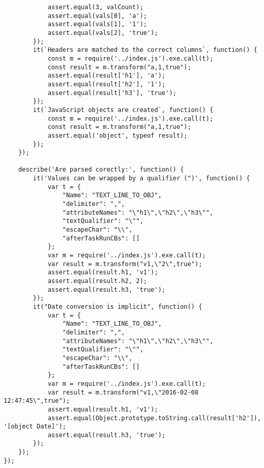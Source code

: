 \begin{verbatim}
            assert.equal(3, valCount);
            assert.equal(vals[0], 'a');
            assert.equal(vals[1], '1');
            assert.equal(vals[2], 'true');
        });
        it(`Headers are matched to the correct columns`, function() {
            const m = require('../index.js').exe.call(t);
            const result = m.transform("a,1,true");
            assert.equal(result['h1'], 'a');
            assert.equal(result['h2'], '1');
            assert.equal(result['h3'], 'true');
        });
        it(`JavaScript objects are created`, function() {
            const m = require('../index.js').exe.call(t);
            const result = m.transform("a,1,true");
            assert.equal('object', typeof result);
        });
    });

    describe('Are parsed corectly:', function() {
        it('Values can be wrapped by a qualifier (")', function() {
            var t = {
                "Name": "TEXT_LINE_TO_OBJ",
                "delimiter": ",",
                "attributeNames": "\"h1\",\"h2\",\"h3\"",
                "textQualifier": "\"",
                "escapeChar": "\\",
                "afterTaskRunCBs": []
            };
            var m = require('../index.js').exe.call(t);
            var result = m.transform("v1,\"2\",true");
            assert.equal(result.h1, 'v1');
            assert.equal(result.h2, 2);
            assert.equal(result.h3, 'true');
        });
        it("Date conversion is implicit", function() {
            var t = {
                "Name": "TEXT_LINE_TO_OBJ",
                "delimiter": ",",
                "attributeNames": "\"h1\",\"h2\",\"h3\"",
                "textQualifier": "\"",
                "escapeChar": "\\",
                "afterTaskRunCBs": []
            };
            var m = require('../index.js').exe.call(t);
            var result = m.transform("v1,\"2016-02-08 12:47:45\",true");
            assert.equal(result.h1, 'v1');
            assert.equal(Object.prototype.toString.call(result['h2']), '[object Date]');
            assert.equal(result.h3, 'true');
        });
    });
});
\end{verbatim}

